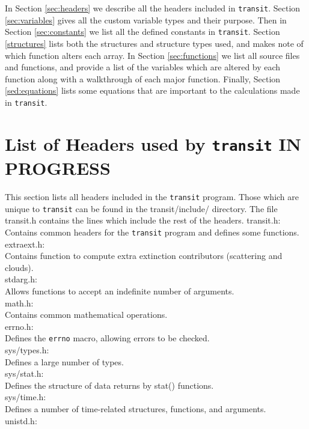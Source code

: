 \documentclass[letterpaper,12pt]{article}
\begin{document}
In Section \ref{sec:headers} we describe all the headers included in {\tt transit}. Section \ref{sec:variables} gives all the custom variable types and their purpose. Then in Section \ref{sec:constants} we list all the defined constants in {\tt transit}. Section \ref{structures} lists both the structures and structure types used, and makes note of which function alters each array. In Section \ref{sec:functions} we list all source files and functions, and provide a list of the variables which are altered by each function along with a walkthrough of each major function. Finally, Section \ref{sed:equations} lists some equations that are important to the calculations made in {\tt transit}.

\section{List of Headers used by \texttt{transit} IN PROGRESS}
This section lists all headers included in the {\tt transit} program. Those which are unique to {\tt transit} can be found in the transit/include/ directory. The file transit.h contains the lines which include the rest of the headers.
\label{sec:headers}
transit.h: \\
\indent Contains common headers for the \texttt{transit} program and defines some functions.\\
extraext.h: \\
\indent Contains function to compute extra extinction contributors (scattering and clouds).\\
stdarg.h: \\
\indent Allows functions to accept an indefinite number of arguments. \\
math.h: \\
\indent Contains common mathematical operations. \\
errno.h: \\
\indent Defines the {\tt errno} macro, allowing errors to be checked. \\
sys/types.h: \\
\indent Defines a large number of types. \\
sys/stat.h: \\
\indent Defines the structure of data returns by stat() functions. \\
sys/time.h: \\
\indent Defines a number of time-related structures, functions, and arguments. \\
unistd.h: \\
\end{document}
